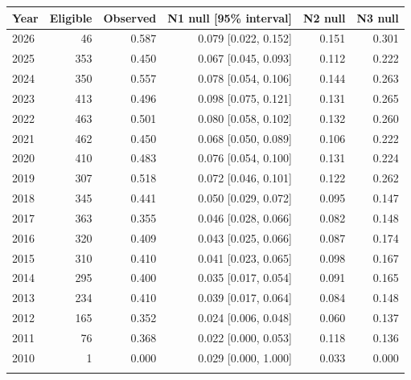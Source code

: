 \begin{tabular}{@{}lrrrrr@{}}
\toprule
Year & Eligible & Observed & N1 null [95\% interval] & N2 null & N3 null\\
\midrule
2026 & 46 & 0.587 & 0.079 [0.022, 0.152] & 0.151 & 0.301\\
2025 & 353 & 0.450 & 0.067 [0.045, 0.093] & 0.112 & 0.222\\
2024 & 350 & 0.557 & 0.078 [0.054, 0.106] & 0.144 & 0.263\\
2023 & 413 & 0.496 & 0.098 [0.075, 0.121] & 0.131 & 0.265\\
2022 & 463 & 0.501 & 0.080 [0.058, 0.102] & 0.132 & 0.260\\
2021 & 462 & 0.450 & 0.068 [0.050, 0.089] & 0.106 & 0.222\\
2020 & 410 & 0.483 & 0.076 [0.054, 0.100] & 0.131 & 0.224\\
2019 & 307 & 0.518 & 0.072 [0.046, 0.101] & 0.122 & 0.262\\
2018 & 345 & 0.441 & 0.050 [0.029, 0.072] & 0.095 & 0.147\\
2017 & 363 & 0.355 & 0.046 [0.028, 0.066] & 0.082 & 0.148\\
2016 & 320 & 0.409 & 0.043 [0.025, 0.066] & 0.087 & 0.174\\
2015 & 310 & 0.410 & 0.041 [0.023, 0.065] & 0.098 & 0.167\\
2014 & 295 & 0.400 & 0.035 [0.017, 0.054] & 0.091 & 0.165\\
2013 & 234 & 0.410 & 0.039 [0.017, 0.064] & 0.084 & 0.148\\
2012 & 165 & 0.352 & 0.024 [0.006, 0.048] & 0.060 & 0.137\\
2011 & 76 & 0.368 & 0.022 [0.000, 0.053] & 0.118 & 0.136\\
2010 & 1 & 0.000 & 0.029 [0.000, 1.000] & 0.033 & 0.000\\
\botrule
\end{tabular}